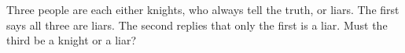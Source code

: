 Three people are each either knights, who always tell the truth, or liars. The first says all three are liars. The second replies that only the first is a liar. Must the third be a knight or a liar?
